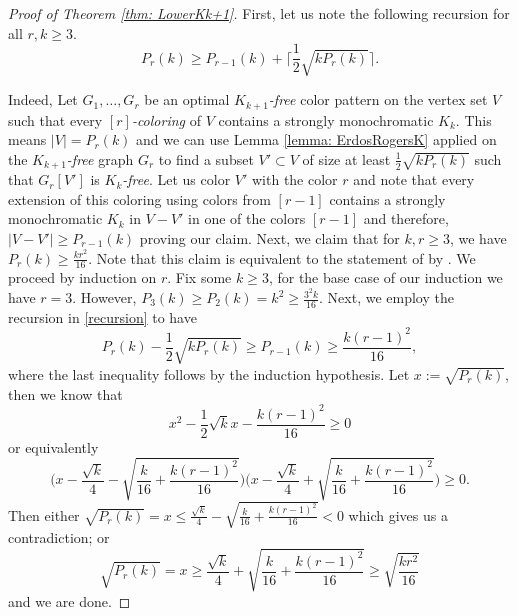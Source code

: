 \documentclass[12pt]{article}
\newcommand{\red}[1]{\textcolor{red}{#1}}
\theoremstyle{definition}
\begin{document}
	\begin{proof}[Proof of Theorem \ref{thm: LowerKk+1}]
		First, let us note the following recursion for all $r,k\geq 3$.  \begin{equation}\label{recursion}
			P_r(k) \geq P_{r-1}(k)+ \Bigg\lceil \frac{1}{2}\sqrt{kP_{r}(k)}\Bigg\rceil.
		\end{equation}
		
		Indeed, Let $G_1,\dots,G_r$ be an optimal $K_{k+1}$\textit{-free} color pattern on the vertex set $V$ such that every $[r]$\textit{-coloring} of $V$ contains a strongly monochromatic $K_k$. This means $|V|=P_r(k)$ and we can use Lemma \ref{lemma: ErdosRogersK} applied on the $K_{k+1}$\textit{-free} graph $G_r$ to find a subset $V'\subset V$ of size at least $\frac{1}{2}\sqrt{k P_r(k)}$ such that $G_r[V']$ is $K_{k}$\textit{-free}. Let us color $V'$ with the color $r$ and note that every extension of this coloring using colors from $[r-1]$ contains a strongly monochromatic $K_k$ in $V-V'$ in one of the colors $[r-1]$ and therefore, $|V-V'| \geq P_{r-1}(k)$ proving our claim. Next, we claim that for $k,r \geq 3$, we have $P_r(k) \geq \frac{kr^2}{16}$. Note that this claim is equivalent to the statement of  by . We proceed by induction on $r$. Fix some $k \geq 3$, for the base case of our induction we have $r=3$. However, $P_3(k) \geq P_2(k)=k^2\geq \frac{3^2k}{16}.$ Next, we employ the recursion in \ref{recursion} to have \begin{equation}
			P_r(k)-\frac{1}{2}\sqrt{kP_r(k)} \geq P_{r-1}(k) \geq \frac{k(r-1)^2}{16}, 
		\end{equation}
		where the last inequality follows by the induction hypothesis. Let $x:= \sqrt{P_r(k)}$, then we know that
		\[x^2-\frac{1}{2}\sqrt{k}x - \frac{k(r-1)^2}{16} \geq 0\]
		or equivalently 
		\[\Biggl(x-\frac{\sqrt{k}}{4} -\sqrt{\frac{k}{16}+\frac{k(r-1)^2}{16}}\Biggr) \Biggl(x-\frac{\sqrt{k}}{4} +\sqrt{\frac{k}{16}+\frac{k(r-1)^2}{16}} \Biggr)\geq 0.\]
		Then either $\sqrt{P_r(k)} =x\leq \frac{\sqrt{k}}{4}-\sqrt{\frac{k}{16}+\frac{k(r-1)^2}{16}}<0$
		which gives us a contradiction; or
		\[\sqrt{P_r(k)}=x \geq \frac{\sqrt{k}}{4} + \sqrt{\frac{k}{16}+\frac{k(r-1)^2}{16}} \geq \sqrt{\frac{kr^2}{16}}\]
		and we are done. 
	\end{proof}
	
\end{document}
